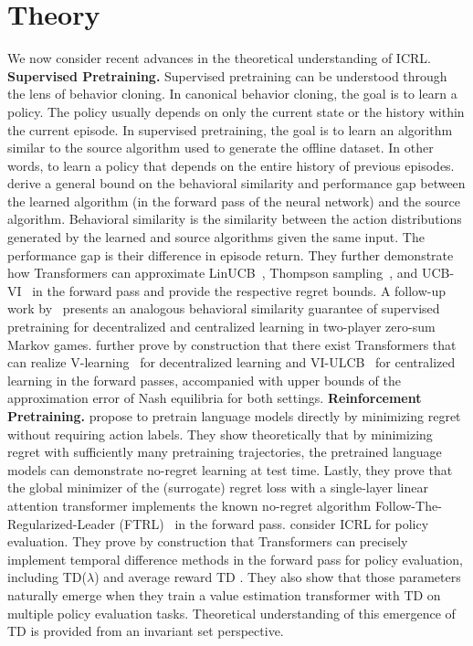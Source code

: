 \documentclass{article}
\newcommand{\tb}[1]{\textbf{#1}}
\newcommand{\compactpara}[1]{\noindent\tb{#1}\quad}
\begin{document}
\section{Theory}\label{sec: theory}
We now consider recent advances in the theoretical understanding of ICRL.
\compactpara{Supervised Pretraining.}
Supervised pretraining can be understood through the lens of behavior cloning.
In canonical behavior cloning,
the goal is to learn a policy.
The policy usually depends on only the current state or the history within the current episode.
In supervised pretraining, the goal is to learn an algorithm similar to the source algorithm used to generate the offline dataset.
In other words, to learn a policy that depends on the entire history of previous episodes.
\citet{linTransformersDecisionMakers2024} derive a general bound on the behavioral similarity and performance gap between the learned algorithm (in the forward pass of the neural network) and the source algorithm.
Behavioral similarity is the similarity between the action distributions generated by the learned and source algorithms given the same input.
The performance gap is their difference in episode return.
They further demonstrate how Transformers can approximate LinUCB~\citep{chu2011contextual}, Thompson sampling~\citep{russo2018tutorial}, and UCB-VI~\citep{azar2017minimax} in the forward pass and provide the respective regret bounds.
A follow-up work by~\citet{shiTransformersGamePlayers2024} presents an analogous behavioral similarity guarantee of supervised pretraining for decentralized and centralized learning in two-player zero-sum Markov games.
\citet{shiTransformersGamePlayers2024} further prove by construction that there exist Transformers that can realize V-learning~\citep{jin2024vlean} for decentralized learning and VI-ULCB~\citep{bai2020vi-ulcb} for centralized learning in the forward passes,
accompanied with upper bounds of the approximation error of Nash equilibria for both settings.
\compactpara{Reinforcement Pretraining.}
\citet{parkLLMAgentsHave2024} propose to pretrain language models directly by minimizing regret without requiring action labels.
They show theoretically that
by minimizing regret with sufficiently many pretraining trajectories,
the pretrained language models can demonstrate no-regret learning at test time.
Lastly, they prove that the global minimizer of the (surrogate) regret loss with a single-layer linear attention transformer implements the known no-regret algorithm Follow-The-Regularized-Leader (FTRL)~\citep{shalev2007online} in the forward pass.
\citet{wangTransformersLearnTemporal2024} consider ICRL for policy evaluation.
They prove by construction that Transformers can precisely implement temporal difference methods in the forward pass for policy evaluation, including TD($\lambda$) \citep{sutton1988learning} and average reward TD \citep{tsitsiklis1999average}.
They also show that those parameters naturally emerge when they train a value estimation transformer with TD on multiple policy evaluation tasks.
Theoretical understanding of this emergence of TD is provided from an invariant set perspective.
\end{document}

